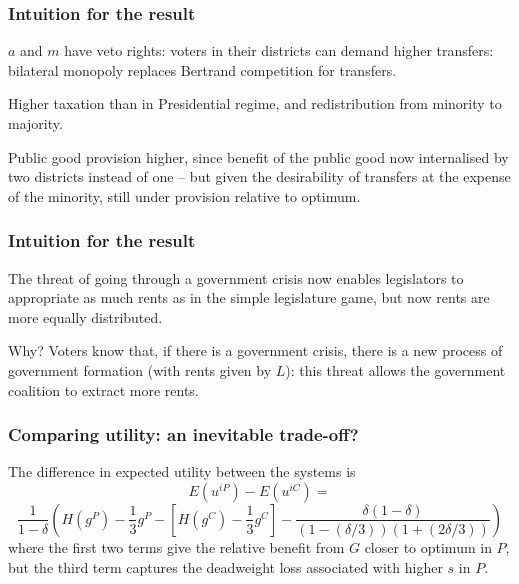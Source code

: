 \documentclass[11pt,aspectratio=169]{beamer}
\begin{document}
\begin{frame}
\frametitle{Intuition for the result}

\noindent $a$ and $m$ have veto rights: voters in their districts can demand higher transfers: bilateral monopoly replaces Bertrand competition for transfers.%

\noindent Higher taxation than in Presidential regime, and redistribution from minority to majority.

\noindent Public good provision higher, since benefit of the public good now internalised by two districts instead of one -- but given the desirability of transfers at the expense of the minority, still under provision relative to optimum.

\end{frame}


\begin{frame}
\frametitle{Intuition for the result}

\noindent The threat of going through a government crisis now enables legislators to appropriate as much rents as in the simple legislature game, but now rents are more equally distributed.

\bigskip

Why? Voters know that, if there is a government crisis, there is a new process of government formation (with rents given by $L$): this threat allows the government coalition to extract more rents.

\end{frame}

\begin{frame}
\frametitle{Comparing utility: an inevitable trade-off?}

\noindent The difference in expected utility between the systems is $$E(u^{iP})-E(u^{iC}) = $$ $$\frac{1}{1-\delta} \left( H(g^P)-\frac{1}{3}g^P - [H(g^C)-\frac{1}{3}g^C] - \frac{\delta(1-\delta)}{(1-(\delta/3))(1+(2\delta/3))} \right)$$ where the first two terms give the relative benefit from $G$ closer to optimum in $P$, but the third term captures the deadweight loss associated with higher $s$ in $P$.

\end{frame}
\end{document}
